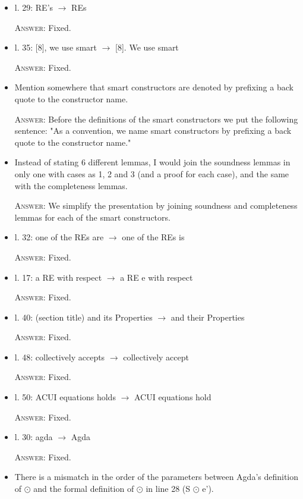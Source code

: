 \documentclass{article}
\begin{document}
\begin{itemize}
    \item l. 29: RE's $\to$ REs

    \textsc{Answer}: Fixed.

    \item l. 35: [8], we use smart $\to$ [8]. We use smart

    \textsc{Answer}: Fixed.

    \item Mention somewhere that smart constructors are denoted by prefixing a back quote to the constructor name.

    \textsc{Answer}: Before the definitions of the smart constructors we put the following sentence:
    "As a convention, we name smart constructors by 
    prefixing a back quote to the constructor name."


    \item Instead of stating 6 different lemmas, I would join the soundness lemmas in only 
     one with cases as 1, 2 and 3 (and a proof for each case), and the same with the completeness lemmas.

    \textsc{Answer}: We simplify the presentation by joining soundness and completeness lemmas for each of the smart constructors.

    \item l. 32: one of the REs are $\to$ one of the REs is

    \textsc{Answer}: Fixed.

    \item l. 17: a RE with respect $\to$ a RE e with respect

    \textsc{Answer}: Fixed.

    \item l. 40: (section title) and its Properties $\to$ and their Properties

    \textsc{Answer}: Fixed.

    \item l. 48: collectively accepts $\to$ collectively accept

    \textsc{Answer}: Fixed.

    \item l. 50: ACUI equations holds $\to$ ACUI equations hold
    
    \textsc{Answer}: Fixed.

    \item l. 30: agda $\to$ Agda

    \textsc{Answer}: Fixed.

    \item There is a mismatch in the order of the parameters between Agda's definition of $\odot$ and the formal definition of $\odot$ in line 28 (S $\odot$ e').


\end{itemize}
\end{document}
